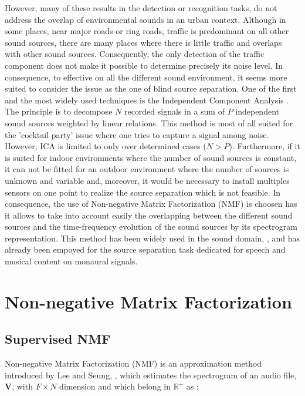 \documentclass[twocolumn,a4paper,10pt]{article}
\begin{document}
However, many of these results in the detection or recognition tasks, do not address the overlap of environmental sounds in an urban context. Although in some places, near major roads or ring roads, traffic is predominant on all other sound sources, there are many places where there is little traffic and overlaps with other sound sources. Consequently, the only detection of the traffic component does not make it possible to determine precisely its noise level. In consequence, to effective on all the different sound environment, it seems more suited to consider the issue as the one of blind source separation. One of the first and the most widely used techniques is the Independent Component Analysis \cite{comon_independent_1994}. The principle is 
to decompose $N$ recorded signals in a sum of $P$ independent sound sources weighted by linear relations. This method is most of all suited for the 'cocktail party' issue where one tries to capture a signal among noise.  However, ICA is limited to only over determined cases ($N > P$). Furthermore, if it is suited for indoor environments where the number of sound sources is constant, it can not be fitted for an outdoor environment where the number of sources is unknown and variable and, moreover, it would be necessary to install multiples sensors on one point to realize the source separation which is not feasible. In consequence, the use of Non-negative Matrix Factorization (NMF) is choosen has it allows to take into account easily the overlapping between the different sound sources and the time-frequency evolution of the sound sources by its spectrogram representation. This method has been widely used in the sound domain, \cite{smaragdis_non-negative_2003} \cite{wilson_speech_2008} \cite{mesaros_sound_2015}, and has already been empoyed for the source separation task dedicated for speech \cite{wilson_speech_2008} and musical content \cite{wang_musical_2005} on monaural signals. 


\section{Non-negative Matrix Factorization}\label{part:nmf}
\subsection{Supervised NMF}
Non-negative Matrix Factorization (NMF) is an approximation method introduced by Lee and Seung, \cite{lee_learning_1999}, which estimates the spectrogram of an audio file, $\mathbf{V}$, with $F \times N $ dimension and which belong in $\mathbb{R}^+$ as : 
\end{document}
